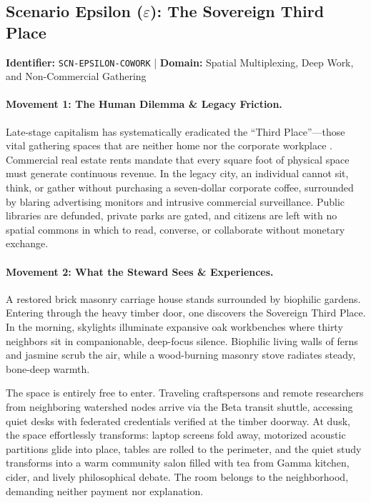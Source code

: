 \subsection{Scenario Epsilon (\texorpdfstring{$\varepsilon$}{Epsilon}): The Sovereign Third Place}
\label{subsec:scn_epsilon}
\textbf{Identifier:} \texttt{SCN-EPSILON-COWORK} \quad | \quad \textbf{Domain:} Spatial Multiplexing, Deep Work, and Non-Commercial Gathering

\paragraph{Movement 1: The Human Dilemma \& Legacy Friction.}
Late-stage capitalism has systematically eradicated the ``Third Place''---those vital gathering spaces that are neither home nor the corporate workplace \parencite{fisher2009}. Commercial real estate rents mandate that every square foot of physical space must generate continuous revenue. In the legacy city, an individual cannot sit, think, or gather without purchasing a seven-dollar corporate coffee, surrounded by blaring advertising monitors and intrusive commercial surveillance. Public libraries are defunded, private parks are gated, and citizens are left with no spatial commons in which to read, converse, or collaborate without monetary exchange.

\paragraph{Movement 2: What the Steward Sees \& Experiences.}
A restored brick masonry carriage house stands surrounded by biophilic gardens. Entering through the heavy timber door, one discovers the Sovereign Third Place. In the morning, skylights illuminate expansive oak workbenches where thirty neighbors sit in companionable, deep-focus silence. Biophilic living walls of ferns and jasmine scrub the air, while a wood-burning masonry stove radiates steady, bone-deep warmth. 

The space is entirely free to enter. Traveling craftspersons and remote researchers from neighboring watershed nodes arrive via the Beta transit shuttle, accessing quiet desks with federated credentials verified at the timber doorway. At dusk, the space effortlessly transforms: laptop screens fold away, motorized acoustic partitions glide into place, tables are rolled to the perimeter, and the quiet study transforms into a warm community salon filled with tea from Gamma kitchen, cider, and lively philosophical debate. The room belongs to the neighborhood, demanding neither payment nor explanation.


